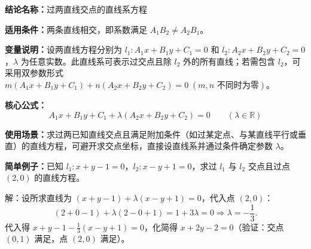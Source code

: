 \textbf{结论名称：}过两直线交点的直线系方程

\textbf{适用条件：}两条直线相交，即系数满足 \(A_1B_2 \neq A_2B_1\)。

\textbf{变量说明：}设两直线方程分别为 \(l_1: A_1x+B_1y+C_1=0\) 和 \(l_2: A_2x+B_2y+C_2=0\)，\(\lambda\) 为任意实数。此直线系可表示过交点且除 \(l_2\) 外的所有直线；若需包含 \(l_2\)，可采用双参数形式 \(m(A_1x+B_1y+C_1)+n(A_2x+B_2y+C_2)=0\;(m,n\text{ 不同时为零})\)。

\textbf{核心公式：}
\[
\boxed{A_1x+B_1y+C_1 + \lambda (A_2x+B_2y+C_2)=0 \qquad (\lambda \in \mathbb{R})}
\]

\textbf{使用场景：}求过两已知直线交点且满足附加条件（如过某定点、与某直线平行或垂直）的直线方程，可避开求交点坐标，直接设直线系并通过条件确定参数 \(\lambda\)。

\textbf{简单例子：}已知 \(l_1: x+y-1=0\)，\(l_2: x-y+1=0\)，求过 \(l_1\) 与 \(l_2\) 交点且过点 \((2,0)\) 的直线方程。

解：设所求直线为 \((x+y-1)+\lambda(x-y+1)=0\)，代入点 \((2,0)\)：
\[
(2+0-1)+\lambda(2-0+1)=1+3\lambda=0 \Rightarrow \lambda=-\frac{1}{3}.
\]
代入得 \(x+y-1-\frac{1}{3}(x-y+1)=0\)，化简得 \(x+2y-2=0\)（验证：交点 \((0,1)\) 满足，点 \((2,0)\) 满足）。